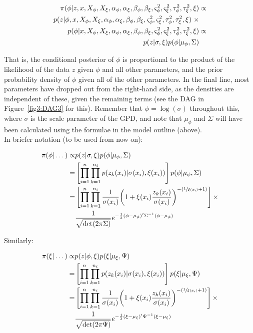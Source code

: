 \documentclass{article}
\begin{document}
\begin{align*}
\pi(\phi | z, x, X_\phi, X_\xi, \alpha_\phi, \alpha_\xi, \beta_\phi, \beta_\xi, \varsigma^2_\phi, \varsigma^2_\xi, \tau^2_\phi, \tau^2_\xi, \xi) & \propto \\
\vspace{5 pt}
p(z | \phi, x, X_\phi, X_\xi, \alpha_\phi, \alpha_\xi, \beta_\phi, \beta_\xi, \varsigma^2_\phi, \varsigma^2_\xi, \tau^2_\phi, \tau^2_\xi, \xi) \hspace{3 pt} \times & \\
p(\phi | x, X_\phi, X_\xi, \alpha_\phi, \alpha_\xi, \beta_\phi, \beta_\xi, \varsigma^2_\phi, \varsigma^2_\xi, \tau^2_\phi, \tau^2_\xi, \xi) & \propto \\
p(z | \sigma, \xi)  p(\phi | \mu_\phi, \Sigma) &
\end{align*}

That is, the conditional posterior of $\phi$ is proportional to the product of the likelihood of the data $z$ given $\phi$ and all other parameters, and the prior probability density of $\phi$ given all of the other parameters. In the final line, most parameters have dropped out from the right-hand side, as the densities are independent of
these, given the remaining terms (see the DAG in Figure~\ref{fig3:DAG3} for this). Remember that $\phi = \log(\sigma)$ throughout this, where $\sigma$ is the scale parameter of the GPD, and note that $\mu_\phi$ and $\Sigma$ will have been calculated using the formulae in the model outline (above). \\

In briefer notation (to be used from now on):

\begin{align*}
\pi(\phi | \dots ) \propto & p(z | \sigma, \xi)  p(\phi | \mu_\phi, \Sigma) \\
= & \left[ \prod_{i=1}^n \prod_{k=1}^{n_i} p(z_k(x_i) | \sigma(x_i), \xi(x_i)) \right] p(\phi | \mu_\phi, \Sigma) \\
= & \left[ \prod_{i=1}^n \prod_{k=1}^{n_i} \frac{1}{\sigma(x_i)} \bigg( 1 + \xi(x_i) \frac{z_k(x_i)}{\sigma(x_i)} \bigg)^{-(\sfrac{1}{\xi(x_i)} + 1)} \right] \times \\
& \frac{1}{\sqrt{\det(2 \pi \Sigma)}} e^{-\frac{1}{2} (\phi - \mu_\phi)' \Sigma^{-1} (\phi - \mu_\phi) }
\end{align*}

Similarly:

\begin{align*}
\pi(\xi | \dots ) \propto & p(z | \phi, \xi)  p(\xi | \mu_\xi, \Psi) \\
= & \left[ \prod_{i=1}^n \prod_{k=1}^{n_i} p(z_k(x_i) | \sigma(x_i), \xi(x_i)) \right] p(\xi | \mu_\xi, \Psi) \\
= & \left[ \prod_{i=1}^n \prod_{k=1}^{n_i} \frac{1}{\sigma(x_i)} \bigg( 1 + \xi(x_i) \frac{z_k(x_i)}{\sigma(x_i)} \bigg)^{-(\sfrac{1}{\xi(x_i)} + 1)} \right] \times \\
& \frac{1}{\sqrt{\det(2 \pi \Psi)}} e^{-\frac{1}{2} (\xi - \mu_\xi)' \Psi^{-1} (\xi - \mu_\xi) }
\end{align*}
\end{document}
